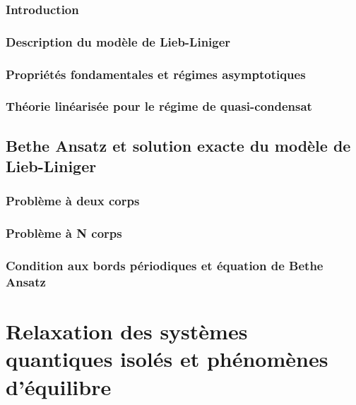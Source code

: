 \minitoc

%

\section*{Introduction}
%

\section{Description du modèle de Lieb-Liniger}

\section{Propriétés fondamentales et régimes asymptotiques}
\section{Théorie linéarisée pour le régime de quasi-condensat}

\chapter{Bethe Ansatz et solution exacte du modèle de Lieb-Liniger}
\minitoc
\section{Problème à deux corps}
\section{Problème à N corps}
\section{Condition aux bords périodiques et équation de Bethe Ansatz}


\part{Relaxation des systèmes quantiques isolés et phénomènes d'équilibre}

